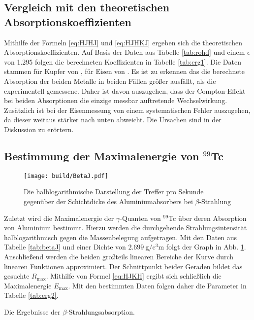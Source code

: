 \subsection{Vergleich mit den theoretischen Absorptionskoeffizienten}
Mithilfe der Formeln \ref{eq:HJHJ} und \ref{eq:HJHKJ} ergeben sich die theoretischen
Absorptionskoeffizienten. Auf Basis der Daten aus Tabelle \ref{tab:rohd} und einem
 $\epsilon$ von 1.295 \cite{V704} folgen die berechneten Koeffizienten in Tabelle \ref{tab:erg1}.
 Die Daten stammen für Kupfer von \cite{Kupfer}, für Eisen von \cite{Eisen}.
Es ist zu erkennen das die berechnete Absorption der beiden Metalle in beiden
Fällen größer ausfällt, als die experimentell gemessene. Daher ist davon auszugehen,
dass der Compton-Effekt bei beiden Absorptionen die einzige messbar auftretende Wechselwirkung.
Zusätzlich ist bei der Eisenmessung von einem systematischen Fehler auszugehen,
da dieser weitaus stärker nach unten abweicht. Die Ursachen sind in der Diskussion zu erörtern.
\subsection{Bestimmung der Maximalenergie von $^{99}$Tc }


\begin{figure}
 \centering
 \caption{Die halblogarithmische Darstellung der Treffer pro Sekunde gegenüber der Schichtdicke des Aluminiumabsorbers bei $\beta$-Strahlung}
 \texttt{[image: build/BetaJ.pdf]}
 \label{fig:betaj}
\end{figure}

Zuletzt wird die Maximalenergie der $\gamma$-Quanten von $^{99}$Tc über deren Absorption von Aluminium bestimmt. Hierzu werden
die durchgehende Strahlungsintensität halblogarithmisch gegen die Massenbelegung aufgetragen.
Mit den Daten aus Tabelle \ref{tab:betaJ} und einer Dichte von $\SI{2.699}{\gram\per\cubic\centi\meter}$ folgt der Graph in Abb. \ref{fig:betaj}. Anschließend werden
die beiden großteils linearen Bereiche der Kurve durch linearen Funktionen approximiert. Der
 Schnittpunkt beider Geraden bildet das gesuchte $R_\text{max}$. Mithilfe von Formel \ref{eq:HJKH}
 ergibt sich schließlich die Maximalenergie $E_\text{max}$. Mit den bestimmten Daten folgen daher die Parameter in Tabelle \ref{tab:erg2}.
\begin{table}
 \centering
 \caption{Die Ergebnisse der $\beta$-Strahlungsabsorption.}
 
 \label{tab:erg2}
\end{table}
